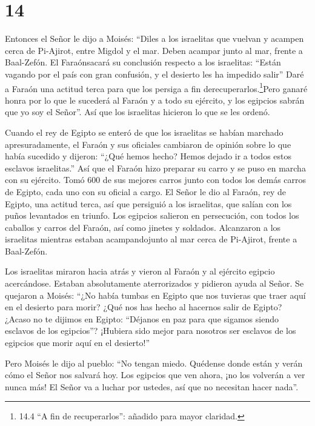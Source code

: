 \hypertarget{section-13}{%
\section{14}\label{section-13}}

 Entonces el Señor le dijo a Moisés:  ``Diles a
los israelitas que vuelvan y acampen cerca de Pi-Ajirot, entre Migdol y
el mar. Deben acampar junto al mar, frente a Baal-Zefón.  El
Faraónsacará su conclusión respecto a los israelitas: ``Están vagando
por el país con gran confusión, y el desierto les ha impedido salir''
 Daré a Faraón una actitud terca para que los persiga a fin
derecuperarlos.\footnote{14.4 ``A fin de recuperarlos'': añadido para
  mayor claridad.}Pero ganaré honra por lo que le sucederá al Faraón y a
todo su ejército, y los egipcios sabrán que yo soy el Señor''. Así que
los israelitas hicieron lo que se les ordenó.

 Cuando el rey de Egipto se enteró de que los israelitas se
habían marchado apresuradamente, el Faraón y sus oficiales cambiaron de
opinión sobre lo que había sucedido y dijeron: ``¿Qué hemos hecho? Hemos
dejado ir a todos estos esclavos israelitas.''  Así que el
Faraón hizo preparar su carro y se puso en marcha con su ejército.
 Tomó 600 de sus mejores carros junto con todos los demás
carros de Egipto, cada uno con su oficial a cargo.  El Señor
le dio al Faraón, rey de Egipto, una actitud terca, así que persiguió a
los israelitas, que salían con los puños levantados en triunfo.
 Los egipcios salieron en persecución, con todos los
caballos y carros del Faraón, así como jinetes y soldados. Alcanzaron a
los israelitas mientras estaban acampandojunto al mar cerca de
Pi-Ajirot, frente a Baal-Zefón.

 Los israelitas miraron hacia atrás y vieron al Faraón y al
ejército egipcio acercándose. Estaban absolutamente aterrorizados y
pidieron ayuda al Señor.  Se quejaron a Moisés: ``¿No había
tumbas en Egipto que nos tuvieras que traer aquí en el desierto para
morir? ¿Qué nos has hecho al hacernos salir de Egipto? 
¿Acaso no te dijimos en Egipto: ``Déjanos en paz para que sigamos siendo
esclavos de los egipcios''? ¡Hubiera sido mejor para nosotros ser
esclavos de los egipcios que morir aquí en el desierto!''

 Pero Moisés le dijo al pueblo: ``No tengan miedo. Quédense
donde están y verán cómo el Señor nos salvará hoy. Los egipcios que ven
ahora, ¡no los volverán a ver nunca más!  El Señor va a
luchar por ustedes, así que no necesitan hacer nada''.

